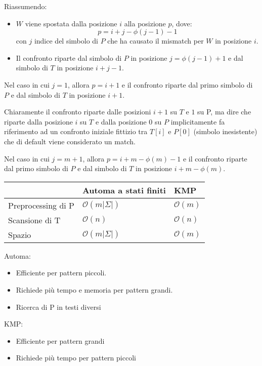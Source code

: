 Riassumendo:
\begin{itemize}
    \item $W$ viene spostata dalla posizione $i$ alla posizione $p$, dove:
          $$p = i + j - \phi(j - 1) - 1$$ con $j$ indice del simbolo di $P$ che ha
          causato il mismatch per $W$ in posizione $i$.
    \item Il confronto riparte dal simbolo di $P$ in posizione $j = \phi(j - 1) + 1$
          e dal simbolo di $T$ in posizione $i + j - 1$.
\end{itemize}
Nel caso in cui $j = 1$, allora $p = i + 1$ e il confronto riparte dal primo
simbolo di $P$ e dal simbolo di $T$ in posizione $i + 1$.
\begin{nota}
    Chiaramente il confronto riparte dalle posizioni $i + 1$ su $T$ e $1$ su P,
    ma dire che riparte dalla posizione $i$ su $T$ e dalla posizione $0$ su $P$
    implicitamente fa riferimento ad un confronto iniziale fittizio tra $T[i]$ e
    $P[0]$ (simbolo inesistente) che di default viene considerato un match.
\end{nota}
Nel caso in cui $j = m + 1$, allora $p = i + m - \phi(m) - 1$ e il confronto
riparte dal primo simbolo di $P$ e dal simbolo di $T$ in posizione $i + m - \phi(m)$.

\begin{table}[!ht]
    \centering
    \begin{tabular}{|l|l|l|}
        \hline
                           & Automa a stati finiti       & KMP              \\ \hline
        Preprocessing di P & $\mathcal{O}(m | \Sigma |)$ & $\mathcal{O}(m)$ \\ \hline
        Scansione di T     & $\mathcal{O}(n)$            & $\mathcal{O}(n)$ \\ \hline
        Spazio             & $\mathcal{O}(m | \Sigma |)$ & $\mathcal{O}(m)$ \\ \hline
    \end{tabular}
\end{table}

Automa:
\begin{itemize}
    \item Efficiente per pattern piccoli.
    \item Richiede più tempo e memoria per pattern grandi.
    \item Ricerca di P in testi diversi
\end{itemize}
KMP:
\begin{itemize}
    \item Efficiente per pattern grandi
    \item Richiede più tempo per pattern piccoli
\end{itemize}

